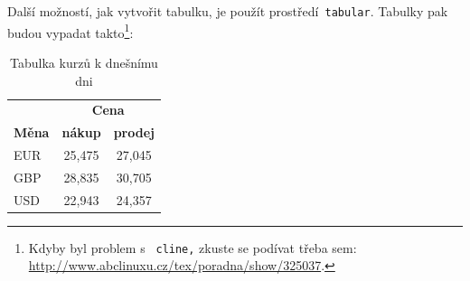 \documentclass[a4paper, 11pt]{article}
\begin{document}
Další možností, jak vytvořit tabulku, je použít prostředí\verb| tabular|. Tabulky pak 
budou vypadat takto\footnote{Kdyby byl problem s \texttt{ cline,} zkuste se podívat třeba sem: 
\url{http://www.abclinuxu.cz/tex/poradna/show/325037}.}:
\bigskip
%
\begin{table}[h]
\centering
\begin{tabular}{|l|c|c|}
\hline
    & \multicolumn{2}{c|}{\textbf{Cena}} \\
    \cline{2-3}
    \textbf{Měna} & \textbf{nákup} & \textbf{prodej} \\ \hline
    EUR & 25,475 & 27,045 \\
    GBP & 28,835 & 30,705 \\
    USD & 22,943 & 24,357 \\
\hline
\end{tabular} \caption{Tabulka kurzů k dnešnímu dni} \label{tab:1}
\end{table}
\bigskip
%
\end{document}
